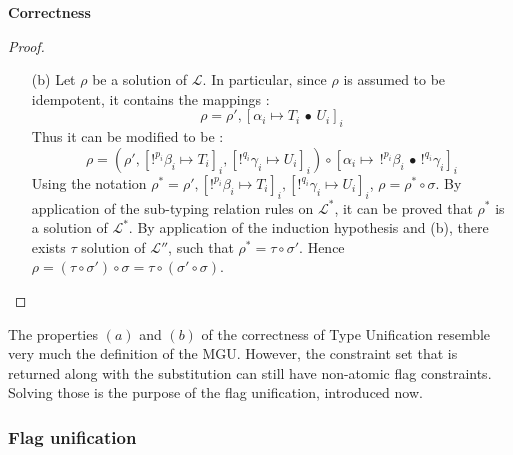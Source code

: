 \begin{thm}{\bf Correctness}
\begin{proof}
\begin{itemize}
\begin{itemize}
						\item[(b)] Let $\rho$ be a solution of $\mathcal{L}$. In particular, since $\rho$ is assumed to be idempotent,
							it contains the mappings :
								$$\rho = \rho', [\alpha_i \mapsto T_i \,\bullet\, U_i]_i$$
							Thus it can be modified to be :
								$$\rho = (\rho',[!^{p_i}\beta_i \mapsto T_i]_i, [!^{q_i}\gamma_i \mapsto U_i]_i) \circ
									[\alpha_i \mapsto \,!^{p_i}\beta_i \,\bullet\, !^{q_i}\gamma_i]_i$$
							Using the notation $\rho^* = \rho' ,[!^{p_i}\beta_i \mapsto T_i]_i,[!^{q_i}\gamma_i \mapsto U_i]_i$,
							$\rho = \rho^* \circ \sigma$. By application of the sub-typing relation rules on $\mathcal{L}^*$, it can be proved
							that $\rho^*$ is a solution of $\mathcal{L}^*$. By application of the induction hypothesis and (b), there exists
							$\tau$ solution of $\mathcal{L''}$, such that $\rho^* = \tau \circ \sigma'$. Hence $\rho = (\tau \circ \sigma') \circ \sigma =
							\tau \circ (\sigma' \circ \sigma)$.
					\end{itemize}
		\end{itemize}
	\end{proof}
\end{thm}

\begin{remark} The properties $(a)$ and $(b)$ of the correctness of Type Unification resemble very much the definition of the MGU.
	However, the constraint set that is returned along with the substitution can still have non-atomic flag constraints.
	Solving those is the purpose of the flag unification, introduced now.
\end{remark}

\subsubsection{Flag unification}

